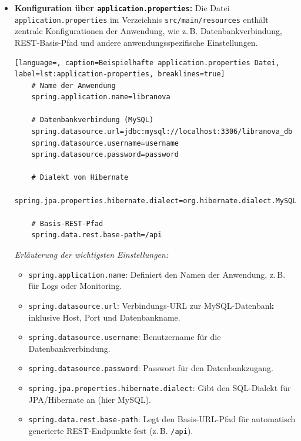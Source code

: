 \begin{itemize}
  \noindent \textit{Erläuterung der Main-Klasse:}
  \begin{itemize}
  	\item \texttt{@SpringBootApplication}: Diese Annotation bündelt die Konfiguration, Auto-Konfiguration und Komponentensuche in einer einzigen Annotation und ist der zentrale Startpunkt für die Spring-Boot-Anwendung.
  	\item \texttt{public class SpringBootLibraryApplication}: Definition der Hauptklasse, die die Anwendung repräsentiert.
  	\item \texttt{public static void main(String[] args)}: Die Main-Methode dient als Einstiegspunkt der Java-Anwendung. Sie wird beim Programmstart aufgerufen.
  	\item \texttt{SpringApplication.run(...) }: Diese Methode startet den eingebetteten Server, initialisiert den Spring Application Context und lädt alle Komponenten, Beans und Konfigurationen.
  \end{itemize}

\item \textbf{Konfiguration über \texttt{application.properties}:} Die Datei \texttt{application.properties} im Verzeichnis \texttt{src/main/resources} enthält zentrale Konfigurationen der Anwendung, wie z.\,B. Datenbankverbindung, REST-Basis-Pfad und andere anwendungsspezifische Einstellungen.

\begin{lstlisting}[language=, caption=Beispielhafte application.properties Datei, label=lst:application-properties, breaklines=true]
	# Name der Anwendung
	spring.application.name=libranova
	
	# Datenbankverbindung (MySQL)
	spring.datasource.url=jdbc:mysql://localhost:3306/libranova_db
	spring.datasource.username=username
	spring.datasource.password=password
	
	# Dialekt von Hibernate
	spring.jpa.properties.hibernate.dialect=org.hibernate.dialect.MySQLDialect
	
	# Basis-REST-Pfad
	spring.data.rest.base-path=/api
\end{lstlisting}

\textit{Erläuterung der wichtigsten Einstellungen:}
\begin{itemize}
	\item \texttt{spring.application.name}: Definiert den Namen der Anwendung, z.\,B. für Logs oder Monitoring.
	\item \texttt{spring.datasource.url}: Verbindungs-URL zur MySQL-Datenbank inklusive Host, Port und Datenbankname.
	\item \texttt{spring.datasource.username}: Benutzername für die Datenbankverbindung.
	\item \texttt{spring.datasource.password}: Passwort für den Datenbankzugang.
	\item \texttt{spring.jpa.properties.hibernate.dialect}: Gibt den SQL-Dialekt für JPA/Hibernate an (hier MySQL).
	\item \texttt{spring.data.rest.base-path}: Legt den Basis-URL-Pfad für automatisch generierte REST-Endpunkte fest (z.\,B. \texttt{/api}).
\end{itemize}


\end{itemize}
